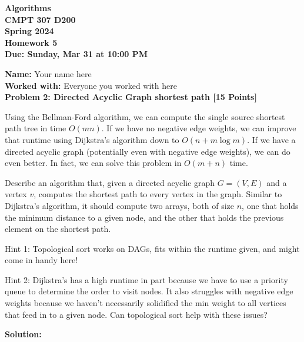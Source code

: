 \documentclass[12pt]{article}
\newcommand{\Name}[1]{\noindent \textbf{Name:} #1 \\}
\newcommand{\Workedwith}[1]{\noindent \textbf{Worked with:} #1 \\}
\newcommand{\Problem}[3]{\mbox{} \newline \noindent \textbf{\textbf{Problem #1: #2 [#3 Points] \\ }}}
\begin{document}
\begin{center}
  \bf
  Algorithms \\
  CMPT 307 D200 \\
  Spring 2024 \\
  \rm
  Homework 5\\
  Due:  Sunday, Mar 31 at 10:00 PM \\
\end{center}

\Name{Your name here}
\Workedwith{Everyone you worked with here}

\Problem{2}{Directed Acyclic Graph shortest path}{15}

Using the Bellman-Ford algorithm, we can compute the single source shortest path tree in time $O(mn)$.
If we have no negative edge weights, we can improve that runtime using Dijkstra's algorithm down to $O(n + m \log m)$.
If we have a directed acyclic graph (potentially even with negative edge weights), we can do even better.
In fact, we can solve this problem in $O(m + n)$ time.

Describe an algorithm that, given a directed acyclic graph $G = (V, E)$ and a vertex $v$, computes the shortest path to every vertex in the graph.
Similar to Dijkstra's algorithm, it should compute two arrays, both of size $n$, one that holds the minimum distance to a given node, and the other that holds the previous element on the shortest path.

Hint 1: Topological sort works on DAGs, fits within the runtime given, and might come in handy here!

Hint 2: Dijkstra's has a high runtime in part because we have to use a priority queue to determine the order to visit nodes. It also struggles with negative edge weights because we haven't necessarily solidified the min weight to all vertices that feed in to a given node. Can topological sort help with these issues?

\textbf{Solution:}
\end{document}
